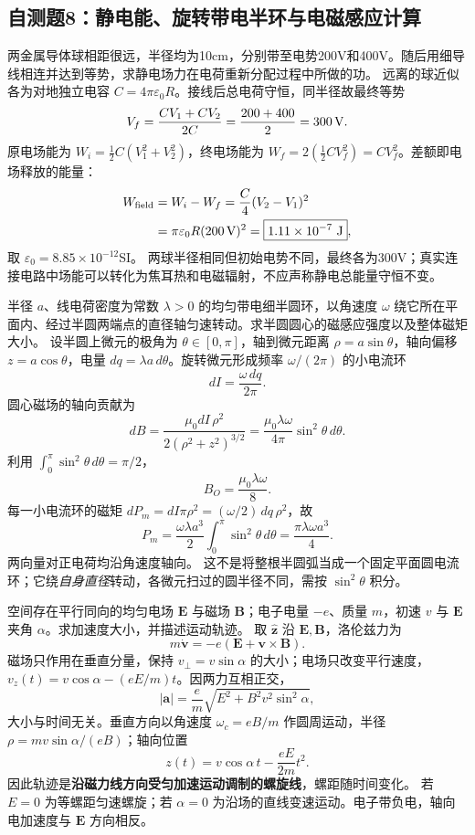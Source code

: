 \subsection{自测题8：静电能、旋转带电半环与电磁感应计算}

\problemtext 两金属导体球相距很远，半径均为10cm，分别带至电势200V和400V。随后用细导线相连并达到等势，求静电场力在电荷重新分配过程中所做的功。
\workings 远离的球近似各为对地独立电容 $C=4\pi\varepsilon_0 R$。接线后总电荷守恒，同半径故最终等势
\[V_f=\frac{CV_1+CV_2}{2C}=\frac{200+400}{2}=300\,{\rm V}.\]
原电场能为 $W_i=\tfrac12 C(V_1^2+V_2^2)$，终电场能为 $W_f=2(\tfrac12CV_f^2)=CV_f^2$。差额即电场释放的能量：
\[
\begin{aligned}
W_{\rm field}&=W_i-W_f=\frac C4(V_2-V_1)^2\\
&=\pi\varepsilon_0 R(200\,{\rm V})^2
=\boxed{1.11\times10^{-7}\ {\rm J}},
\end{aligned}
\]
取 $\varepsilon_0=8.85\times10^{-12}$SI。
\crosscheck 两球半径相同但初始电势不同，最终各为300V；真实连接电路中场能可以转化为焦耳热和电磁辐射，不应声称静电总能量守恒不变。

\problemtext 半径 $a$、线电荷密度为常数 $\lambda>0$ 的均匀带电细半圆环，以角速度 $\omega$ 绕它所在平面内、经过半圆两端点的直径轴匀速转动。求半圆圆心的磁感应强度以及整体磁矩大小。
\workings 设半圆上微元的极角为 $\theta\in[0,\pi]$，轴到微元距离 $\rho=a\sin\theta$，轴向偏移 $z=a\cos\theta$，电量 $dq=\lambda a\,d\theta$。旋转微元形成频率 $\omega/(2\pi)$ 的小电流环
\[dI=\frac{\omega\,dq}{2\pi}.\]
圆心磁场的轴向贡献为
\[dB=\frac{\mu_0dI\,\rho^2}{2(\rho^2+z^2)^{3/2}}
=\frac{\mu_0\lambda\omega}{4\pi}\sin^2\theta\,d\theta.\]
利用 $\int_0^\pi\sin^2\theta\,d\theta=\pi/2$，
\[\boxed{B_O=\frac{\mu_0\lambda\omega}{8}}.\]
每一小电流环的磁矩 $dP_m=dI\pi\rho^2=(\omega/2)\,dq\,\rho^2$，故
\[
\boxed{P_m=\frac{\omega\lambda a^3}{2}
\int_0^\pi\sin^2\theta\,d\theta
=\frac{\pi\lambda\omega a^3}{4}}.
\]
两向量对正电荷均沿角速度轴向。
\crosscheck 这不是将整根半圆弧当成一个固定平面圆电流环；它绕\emph{自身直径}转动，各微元扫过的圆半径不同，需按 $\sin^2\theta$ 积分。

\problemtext 空间存在平行同向的均匀电场 $\bm E$ 与磁场 $\bm B$；电子电量 $-e$、质量 $m$，初速 $v$ 与 $\bm E$ 夹角 $\alpha$。求加速度大小，并描述运动轨迹。
\workings 取 $\hat{\bm z}$ 沿 $\bm E,\bm B$，洛伦兹力为
\[m\dot{\bm v}=-e(\bm E+\bm v\times\bm B).\]
磁场只作用在垂直分量，保持 $v_\perp=v\sin\alpha$ 的大小；电场只改变平行速度，$v_z(t)=v\cos\alpha-(eE/m)t$。因两力互相正交，
\[
\boxed{|\bm a|=\frac e m\sqrt{E^2+B^2v^2\sin^2\alpha}},
\]
大小与时间无关。垂直方向以角速度 $\omega_c=eB/m$ 作圆周运动，半径 $\rho=mv\sin\alpha/(eB)$；轴向位置
\[\boxed{z(t)=v\cos\alpha\,t-\frac{eE}{2m}t^2}.\]
因此轨迹是\textbf{沿磁力线方向受匀加速运动调制的螺旋线}，螺距随时间变化。
\crosscheck 若 $E=0$ 为等螺距匀速螺旋；若 $\alpha=0$ 为沿场的直线变速运动。电子带负电，轴向电加速度与 $\bm E$ 方向相反。

